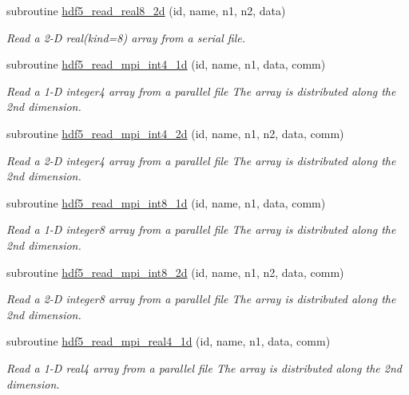 \begin{DoxyCompactItemize}
subroutine \hyperlink{classmodhdf5_a7ba4b99f85945770344cdd73b713ea3a}{hdf5\-\_\-read\-\_\-real8\-\_\-2d} (id, name, n1, n2, data)
\begin{DoxyCompactList}\small\item\em Read a 2-\/\-D real(kind=8) array from a serial file. \end{DoxyCompactList}\item 
subroutine \hyperlink{classmodhdf5_a18b987f7a44198ccc7dd893cbdc322fc}{hdf5\-\_\-read\-\_\-mpi\-\_\-int4\-\_\-1d} (id, name, n1, data, comm)
\begin{DoxyCompactList}\small\item\em Read a 1-\/\-D integer4 array from a parallel file The array is distributed along the 2nd dimension. \end{DoxyCompactList}\item 
subroutine \hyperlink{classmodhdf5_ac96ae5057bcd6745840c716a232d4b66}{hdf5\-\_\-read\-\_\-mpi\-\_\-int4\-\_\-2d} (id, name, n1, n2, data, comm)
\begin{DoxyCompactList}\small\item\em Read a 2-\/\-D integer4 array from a parallel file The array is distributed along the 2nd dimension. \end{DoxyCompactList}\item 
subroutine \hyperlink{classmodhdf5_a2847f70176f88d95e8e6e1bec3a2539e}{hdf5\-\_\-read\-\_\-mpi\-\_\-int8\-\_\-1d} (id, name, n1, data, comm)
\begin{DoxyCompactList}\small\item\em Read a 1-\/\-D integer8 array from a parallel file The array is distributed along the 2nd dimension. \end{DoxyCompactList}\item 
subroutine \hyperlink{classmodhdf5_a41bc63b78ce861c9898ef45642514a9d}{hdf5\-\_\-read\-\_\-mpi\-\_\-int8\-\_\-2d} (id, name, n1, n2, data, comm)
\begin{DoxyCompactList}\small\item\em Read a 2-\/\-D integer8 array from a parallel file The array is distributed along the 2nd dimension. \end{DoxyCompactList}\item 
subroutine \hyperlink{classmodhdf5_a7c2f69141e8a85768536e7c8f79f6348}{hdf5\-\_\-read\-\_\-mpi\-\_\-real4\-\_\-1d} (id, name, n1, data, comm)
\begin{DoxyCompactList}\small\item\em Read a 1-\/\-D real4 array from a parallel file The array is distributed along the 2nd dimension. \end{DoxyCompactList}\item 

\end{DoxyCompactItemize}

